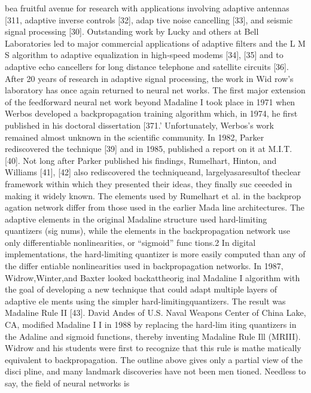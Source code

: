 \documentclass[11pt,a4paper,twocolumn]{article}
\begin{document}

bea fruitful avenue for research with applications involving 
adaptive antennas [311, adaptive inverse controls [32], adap
tive noise cancelling [33], and seismic signal processing [30]. 
Outstanding work by Lucky and others at Bell Laboratories 
led to major commercial applications of adaptive filters and 
the L M S  algorithm to adaptive equalization in high-speed 
modems [34], [35] and to adaptive echo cancellers for long
distance telephone and satellite circuits [36]. After 20 years 
of research in adaptive signal processing, the work in Wid
row’s laboratory has once again returned to neural net
works. 
The first major extension of the feedforward neural net
work beyond Madaline I took place in 1971 when Werbos 
developed a backpropagation training algorithm which, in 
1974, he first published in his doctoral dissertation [371.’ 
Unfortunately, Werbos’s work remained almost unknown 
in the scientific community. In 1982, Parker rediscovered 
the technique [39] and in 1985, published a report on it at 
M.I.T. [40]. Not long after Parker published his findings, 
Rumelhart, Hinton, and Williams [41], [42] also rediscovered 
the techniqueand, largelyasaresultof theclear framework 
within which they presented their ideas, they finally suc
ceeeded in making it widely known. 
The elements used by Rumelhart et al. in the backprop
agation network differ from those used in the earlier Mada
line architectures. The adaptive elements in the original 
Madaline structure used hard-limiting quantizers (sig
nums), while the elements in the backpropagation network 
use only differentiable nonlinearities, or “sigmoid” func
tions.2 In digital implementations, 
the hard-limiting 
quantizer is more easily computed than any of the differ
entiable nonlinearities used in backpropagation networks. 
In 1987, Widrow,Winter,and Baxter looked backattheorig
inal Madaline I algorithm with the goal of developing a new 
technique that could adapt multiple layers of adaptive ele
ments using the simpler hard-limitingquantizers. The result 
was Madaline Rule II [43]. 
David Andes of U.S. Naval Weapons Center of China Lake, 
CA, modified Madaline I I  in 1988 by replacing the hard-lim
iting quantizers in the Adaline and sigmoid functions, 
thereby inventing Madaline Rule Ill (MRIII). Widrow and his 
students were first to recognize that this rule is mathe
matically equivalent to backpropagation. 
The outline above gives only a partial view of the disci
pline, and many landmark discoveries have not been men
tioned. Needless to say, the field of neural networks is 
\end{document}

